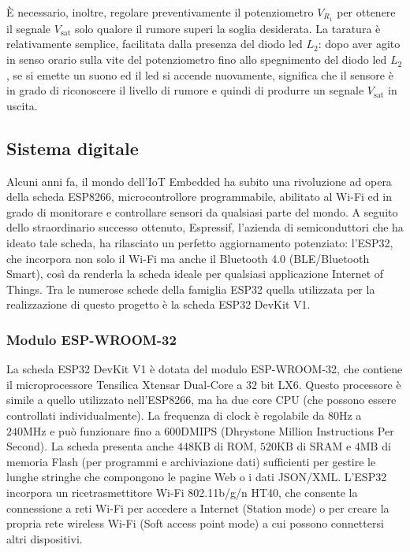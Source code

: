 \documentclass[a4paper,12pt]{report}  %
\begin{document}
È necessario, inoltre, regolare preventivamente il potenziometro $V_{R_1}$ per ottenere il segnale $V_{\text{sat}}$ solo qualore il rumore superi la soglia desiderata.
La taratura è relativamente semplice, facilitata dalla presenza del diodo led $L_2$: dopo aver agito in senso orario sulla vite del potenziometro fino allo spegnimento del diodo led $L_2$, se si emette un suono ed il led si accende nuovamente, significa che il sensore è in grado di riconoscere il livello di rumore e quindi di produrre un segnale $V_{\text{sat}}$ in uscita.

\subsection{Sistema digitale}
Alcuni anni fa, il mondo dell'IoT Embedded ha subito una rivoluzione ad opera della scheda ESP8266, microcontrollore programmabile, abilitato al Wi-Fi ed in grado di monitorare e controllare sensori da qualsiasi parte del mondo.
A seguito dello straordinario successo ottenuto, Espressif, l'azienda di semiconduttori che ha ideato tale scheda, ha rilasciato un perfetto aggiornamento potenziato: l'ESP32, che incorpora non solo il Wi-Fi ma anche il Bluetooth 4.0 (BLE/Bluetooth Smart), così da renderla la scheda ideale per qualsiasi applicazione Internet of Things.
Tra le numerose schede della famiglia ESP32 quella utilizzata per la realizzazione di questo progetto è la scheda ESP32 DevKit V1.

\subsubsection{Modulo ESP-WROOM-32}
La scheda ESP32 DevKit V1 è dotata del modulo ESP-WROOM-32, che contiene il microprocessore Tensilica Xtensar Dual-Core a $32$ bit LX6.
Questo processore è simile a quello utilizzato nell'ESP8266, ma ha due core CPU (che possono essere controllati individualmente).
La frequenza di clock è regolabile da $80 \text{Hz}$ a $240 \text{MHz}$ e può funzionare fino a $600 \text{DMIPS}$ (Dhrystone Million Instructions Per Second).
La scheda presenta anche $448 \text{KB}$ di ROM, $520 \text{KB}$ di SRAM e $4 \text{MB}$ di memoria Flash (per programmi e archiviazione dati) sufficienti per gestire le lunghe stringhe che compongono le pagine Web o i dati JSON/XML.
L'ESP32 incorpora un ricetrasmettitore Wi-Fi 802.11b/g/n HT40, che consente la connessione a reti Wi-Fi per accedere a Internet (Station mode) o per creare la propria rete wireless Wi-Fi (Soft access point mode) a cui possono connettersi altri dispositivi.
\end{document}
